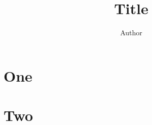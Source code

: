 \documentclass[a4paper,landscape]{article}
\title{Title}\author{Author}\date{}
\begin{document}
\footnotesize
\begin{multicols}{3}
\maketitle\thispagestyle{empty}
\section{One}
\lipsum[1-12]
\section{Two}
\lipsum[13-24]
\end{multicols}
\end{document}
